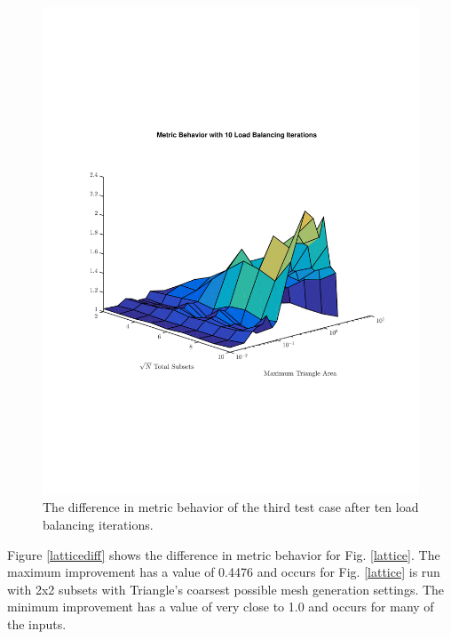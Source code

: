 \documentclass{anstrans}
\begin{document}
\begin{figure}
\centering
\includegraphics[scale=0.50, trim = 0cm 5cm 0cm 5cm,clip]{figures/lattice_iter.pdf}
\caption{The difference in metric behavior of the third test case after ten load balancing iterations.}
\label{latticeiter}
\end{figure}

Figure \ref{latticediff} shows the difference in metric behavior for Fig. \ref{lattice}. The maximum improvement has a value of 0.4476 and occurs for Fig. \ref{lattice} is run with 2x2 subsets with Triangle's coarsest possible mesh generation settings. The minimum improvement has a value of very close to 1.0 and occurs for many of the inputs. 
\end{document}
